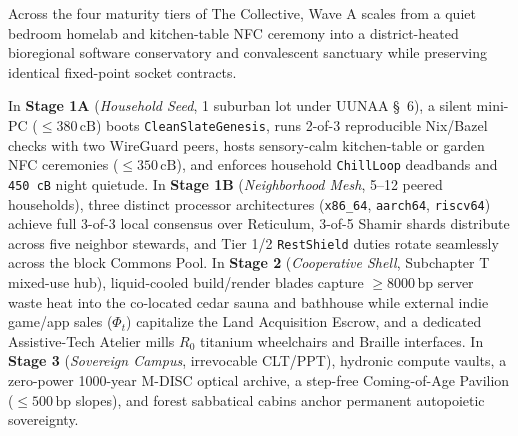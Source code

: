 Across the four maturity tiers of The Collective, Wave A scales from a quiet bedroom homelab and
kitchen-table NFC ceremony into a district-heated bioregional software conservatory and convalescent
sanctuary while preserving identical fixed-point socket contracts.

In \textbf{Stage 1A} (\textit{Household Seed}, 1 suburban lot under UUNAA \S~6), a silent mini-PC
($\le 380\,\mathrm{cB}$) boots \texttt{CleanSlateGenesis}, runs 2-of-3 reproducible Nix/Bazel checks
with two WireGuard peers, hosts sensory-calm kitchen-table or garden NFC ceremonies
($\le 350\,\mathrm{cB}$), and enforces household \texttt{ChillLoop} deadbands and \texttt{450 cB}
night quietude. In \textbf{Stage 1B} (\textit{Neighborhood Mesh}, 5--12 peered households), three
distinct processor architectures (\texttt{x86\_64}, \texttt{aarch64}, \texttt{riscv64}) achieve full
3-of-3 local consensus over Reticulum, 3-of-5 Shamir shards distribute across five neighbor stewards,
and Tier 1/2 \texttt{RestShield} duties rotate seamlessly across the block Commons Pool. In
\textbf{Stage 2} (\textit{Cooperative Shell}, Subchapter T mixed-use hub), liquid-cooled build/render
blades capture $\ge 8000\,\mathrm{bp}$ server waste heat into the co-located cedar sauna and
bathhouse while external indie game/app sales ($\Phi_t$) capitalize the Land Acquisition Escrow, and
a dedicated Assistive-Tech Atelier mills $R_0$ titanium wheelchairs and Braille interfaces. In
\textbf{Stage 3} (\textit{Sovereign Campus}, irrevocable CLT/PPT), hydronic compute vaults, a
zero-power 1000-year M-DISC optical archive, a step-free Coming-of-Age Pavilion
($\le 500\,\mathrm{bp}$ slopes), and forest sabbatical cabins anchor permanent autopoietic sovereignty.

